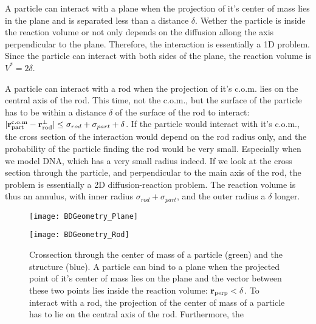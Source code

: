 A particle can interact with a plane when the projection of it's center of mass lies in the plane and is separated less than a distance $\delta$. Wether the particle is inside the reaction volume or not only depends on the diffusion allong the axis perpendicular to the plane. Therefore, the interaction is essentially a 1D problem. Since the particle can interact with both sides of the plane, the reaction volume is $V^*=2 \delta$.

A particle can interact with a rod when the projection of it's c.o.m. lies on the central axis of the rod. This time, not the c.o.m., but the surface of the particle has to be within a distance $\delta$ of the surface of the rod to interact: $|{\bf r}_{\rm part}^{\rm c.o.m}-{\bf r}_{\rm rod}^{\perp}| \leq \sigma_{rod}+\sigma_{part} + \delta$. If the particle would interact with it's c.o.m., the cross section of the interaction would depend on the rod radius only, and the probability of the particle finding the rod would be very small. Especially when we model DNA, which has a very small radius indeed. If we look at the cross section through the particle, and perpendicular to the main axis of the rod, the problem is essentially a 2D diffusion-reaction problem. The reaction volume is thus an annulus, with inner radius $\sigma_{rod} + \sigma_{part}$, and the outer radius a $\delta$ longer.

\begin{figure}[ht]
\begin{minipage}[ht]{.5\linewidth}
\centering
\texttt{[image: BDGeometry\_Plane]}
\end{minipage}
\begin{minipage}[ht]{.5\linewidth}
\centering
\texttt{[image: BDGeometry\_Rod]}
\end{minipage}
\caption{ Crossection through the center of mass of a particle (green) and the structure (blue). A particle can bind to a plane when the projected point of it's center of mass lies on the plane and the vector between these two points lies inside the reaction volume: ${\bf r}_{\rm perp}<\delta$. To interact with a rod, the projection of the center of mass of a particle has to lie on the central axis of the rod. Furthermore, the }
\end{figure}


